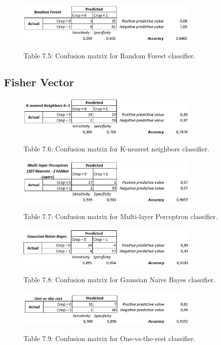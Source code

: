 \documentclass[12pt]{article}
\numberwithin{equation}{section}
\numberwithin{table}{section}
\numberwithin{figure}{section}
\begin{document}
\begin{figure}[H] \centering
	\caption*{Table 7.5: Confusion matrix for Random Forest classifier. }
	\includegraphics[width=0.8\textwidth]{m5.png}
	\label{m5}
\end{figure}

\subsection{Fisher Vector}

\begin{figure}[H] \centering
	\caption*{Table 7.6: Confusion matrix for K-nearest neighbors classifier. }
	\includegraphics[width=0.8\textwidth]{m6.png}
	\label{m6}
\end{figure}

\begin{figure}[H] \centering
	\caption*{Table 7.7: Confusion matrix for Multi-layer Perceptron classifier. }
	\includegraphics[width=0.8\textwidth]{m7.png}
	\label{m7}
\end{figure}

\begin{figure}[H] \centering
	\caption*{Table 7.8: Confusion matrix for Gaussian Naive Bayes classifier. }
	\includegraphics[width=0.8\textwidth]{m8.png}
	\label{m8}
\end{figure}

\begin{figure}[H] \centering
	\caption*{Table 7.9: Confusion matrix for One-vs-the-rest classifier. }
	\includegraphics[width=0.8\textwidth]{m9.png}
	\label{m9}
\end{figure}
\end{document}
